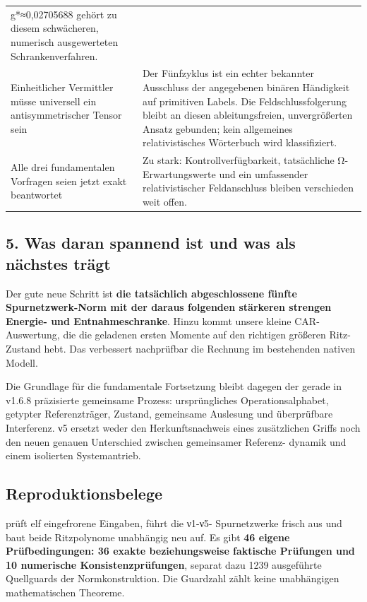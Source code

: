 {\begin{longtable}[]{@{}
  >{\raggedright\arraybackslash}p{}
  >{\raggedright\arraybackslash}p{}@{}}
g*≈0,02705688 gehört zu diesem schwächeren, numerisch ausgewerteten
Schrankenverfahren. \\
Einheitlicher Vermittler müsse universell ein antisymmetrischer Tensor
sein & Der Fünfzyklus ist ein echter bekannter Ausschluss der
angegebenen binären Händigkeit auf primitiven Labels. Die
Feldschlussfolgerung bleibt an diesen ableitungsfreien, unvergrößerten
Ansatz gebunden; kein allgemeines relativistisches Wörterbuch wird
klassifiziert. \\
Alle drei fundamentalen Vorfragen seien jetzt exakt beantwortet & Zu
stark: Kontrollverfügbarkeit, tatsächliche Ω-Erwartungswerte und ein
umfassender relativistischer Feldanschluss bleiben verschieden weit
offen. \\
\end{longtable}
}

\subsection{5. Was daran spannend ist und was als nächstes
trägt}\label{was-daran-spannend-ist-und-was-als-nuxe4chstes-truxe4gt}

Der gute neue Schritt ist \textbf{die tatsächlich abgeschlossene fünfte
Spurnetzwerk-Norm mit der daraus folgenden stärkeren strengen Energie-
und Entnahmeschranke}. Hinzu kommt unsere kleine CAR-Auswertung, die die
geladenen ersten Momente auf den richtigen größeren Ritz-Zustand hebt.
Das verbessert nachprüfbar die Rechnung im bestehenden nativen Modell.

Die Grundlage für die fundamentale Fortsetzung bleibt dagegen der gerade
in v1.6.8 präzisierte gemeinsame Prozess: ursprüngliches
Operationsalphabet, getypter Referenzträger, Zustand, gemeinsame
Auslesung und überprüfbare Interferenz. ν5 ersetzt weder den
Herkunftsnachweis eines zusätzlichen Griffs noch den neuen genauen
Unterschied zwischen gemeinsamer Referenz- dynamik und einem isolierten
Systemantrieb.

\subsection{Reproduktionsbelege}\label{reproduktionsbelege}

 prüft elf eingefrorene Eingaben, führt die
ν1-ν5- Spurnetzwerke frisch aus und baut beide Ritzpolynome unabhängig
neu auf. Es gibt \textbf{46 eigene Prüfbedingungen: 36 exakte
beziehungsweise faktische Prüfungen und 10 numerische
Konsistenzprüfungen}, separat dazu 1239 ausgeführte Quellguards der
Normkonstruktion. Die Guardzahl zählt keine unabhängigen mathematischen
Theoreme.

